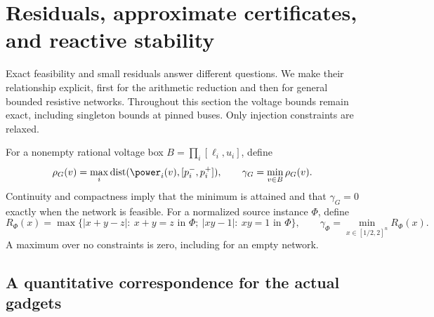 \section{Residuals, approximate certificates, and reactive stability}
\label{sec:numerical}

Exact feasibility and small residuals answer different questions. We make
their relationship explicit, first for the arithmetic reduction and then
for general bounded resistive networks. Throughout this section the voltage
bounds remain exact, including singleton bounds at pinned buses. Only
injection constraints are relaxed.

For a nonempty rational voltage box $B=\prod_i[\ell_i,u_i]$, define
\begin{equation}
 \rho_G(v)=\max_i\operatorname{dist}
       (\power_i(v),[p_i^-,p_i^+]),\qquad
 \gamma_G=\min_{v\in B}\rho_G(v).
 \label{eq:network-residual}
\end{equation}
Continuity and compactness imply that the minimum is attained and that
$\gamma_G=0$ exactly when the network is feasible. For a normalized source
instance $\Phi$, define
\begin{equation}
 R_\Phi(x)=\max\bigl\{|x+y-z|:\ x+y=z\text{ in }\Phi;
             \ |xy-1|:\ xy=1\text{ in }\Phi\bigr\},
 \qquad \gamma_\Phi=\min_{x\in[1/2,2]^n}R_\Phi(x).
 \label{eq:source-residual}
\end{equation}
A maximum over no constraints is zero, including for an empty network.

\subsection{A quantitative correspondence for the actual gadgets}

